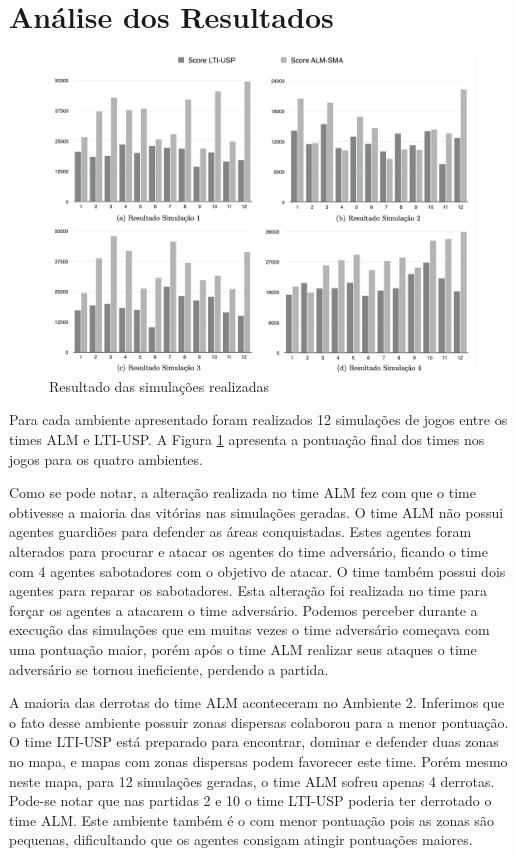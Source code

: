 \documentclass{llncs}
\begin{document}
\section{Análise dos Resultados}

\begin{figure}[!ht]
\centering
\includegraphics[width=1\linewidth]{./images/simulations-chart.png}
\caption{Resultado das simulações realizadas}
\label{fig:resultados}
\end{figure}

Para cada ambiente apresentado foram realizados 12 simulações de jogos entre os times ALM e LTI-USP. A Figura \ref{fig:resultados} apresenta a pontuação final dos times nos jogos para os quatro ambientes.

Como se pode notar, a alteração realizada no time ALM fez com que o time obtivesse a maioria das vitórias nas simulações geradas. O time ALM não possui agentes guardiões para defender as áreas conquistadas. Estes agentes foram alterados para procurar e atacar os agentes do time adversário, ficando o time com 4 agentes sabotadores com o objetivo de atacar. O time também possui dois agentes para reparar os sabotadores. Esta alteração foi realizada no time para forçar os agentes a atacarem o time adversário. Podemos perceber durante a execução das simulações que em muitas vezes o time adversário começava com uma pontuação maior, porém após o time ALM realizar seus ataques o time adversário se tornou ineficiente, perdendo a partida.

A maioria das derrotas do time ALM aconteceram no Ambiente 2. Inferimos que o fato desse ambiente possuir zonas dispersas colaborou para a menor pontuação. O time LTI-USP está preparado para encontrar, dominar e defender duas zonas no mapa, e mapas com zonas dispersas podem favorecer este time. Porém mesmo neste mapa, para 12 simulações geradas, o time ALM sofreu apenas 4 derrotas. Pode-se notar que nas partidas 2 e 10 o time LTI-USP poderia ter derrotado o time ALM. Este ambiente também é o com menor pontuação pois as zonas são pequenas, dificultando que os agentes consigam atingir pontuações maiores.
\end{document}
